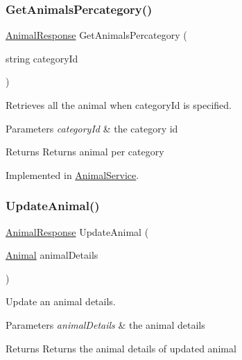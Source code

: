 \subsubsection{\texorpdfstring{Get\+Animals\+Percategory()}{GetAnimalsPercategory()}}
{\footnotesize\ttfamily \hyperlink{classWildLifeTracker_1_1Response_1_1AnimalResponse}{Animal\+Response} Get\+Animals\+Percategory (\begin{DoxyParamCaption}\item[{string}]{category\+Id }\end{DoxyParamCaption})}



Retrieves all the animal when category\+Id is specified. 
\begin{DoxyParams}{Parameters}
{\em category\+Id} & the category id\\
\hline
\end{DoxyParams}
\begin{DoxyReturn}{Returns}
Returns animal per category
\end{DoxyReturn}




Implemented in \hyperlink{classWildLifeTracker_1_1Services_1_1AnimalService_a4b971311981c685104e1b3403c87372a}{Animal\+Service}.

\mbox{\label{interfaceWildLifeTracker_1_1Services_1_1IAnimalService_a993d3155da89897e5403799432be158b}} 
\subsubsection{\texorpdfstring{Update\+Animal()}{UpdateAnimal()}}
{\footnotesize\ttfamily \hyperlink{classWildLifeTracker_1_1Response_1_1AnimalResponse}{Animal\+Response} Update\+Animal (\begin{DoxyParamCaption}\item[{\hyperlink{classWildLifeTracker_1_1Models_1_1Animal}{Animal}}]{animal\+Details }\end{DoxyParamCaption})}



Update an animal details. 
\begin{DoxyParams}{Parameters}
{\em animal\+Details} & the animal details\\
\hline
\end{DoxyParams}
\begin{DoxyReturn}{Returns}
Returns the animal details of updated animal
\end{DoxyReturn}




